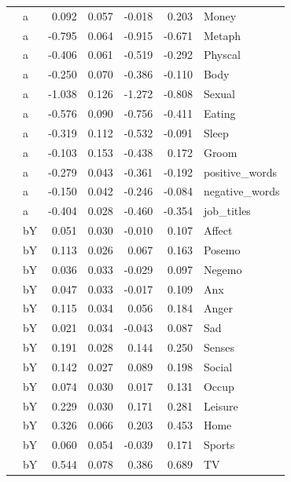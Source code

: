 \documentclass[11pt,a4paper]{article}
\begin{document}
\begin{longtable}{llrrrrl}
   & a &  0.092 &  0.057 &   -0.018 &     0.203 &           Money \\
   & a & -0.795 &  0.064 &   -0.915 &    -0.671 &          Metaph \\
   & a & -0.406 &  0.061 &   -0.519 &    -0.292 &         Physcal \\
   & a & -0.250 &  0.070 &   -0.386 &    -0.110 &            Body \\
   & a & -1.038 &  0.126 &   -1.272 &    -0.808 &          Sexual \\
   & a & -0.576 &  0.090 &   -0.756 &    -0.411 &          Eating \\
   & a & -0.319 &  0.112 &   -0.532 &    -0.091 &           Sleep \\
   & a & -0.103 &  0.153 &   -0.438 &     0.172 &           Groom \\
   & a & -0.279 &  0.043 &   -0.361 &    -0.192 &  positive\_words \\
   & a & -0.150 &  0.042 &   -0.246 &    -0.084 &  negative\_words \\
   & a & -0.404 &  0.028 &   -0.460 &    -0.354 &      job\_titles \\
   & bY &  0.051 &  0.030 &   -0.010 &     0.107 &          Affect \\
   & bY &  0.113 &  0.026 &    0.067 &     0.163 &          Posemo \\
   & bY &  0.036 &  0.033 &   -0.029 &     0.097 &          Negemo \\
   & bY &  0.047 &  0.033 &   -0.017 &     0.109 &             Anx \\
   & bY &  0.115 &  0.034 &    0.056 &     0.184 &           Anger \\
   & bY &  0.021 &  0.034 &   -0.043 &     0.087 &             Sad \\
   & bY &  0.191 &  0.028 &    0.144 &     0.250 &          Senses \\
   & bY &  0.142 &  0.027 &    0.089 &     0.198 &          Social \\
   & bY &  0.074 &  0.030 &    0.017 &     0.131 &           Occup \\
   & bY &  0.229 &  0.030 &    0.171 &     0.281 &         Leisure \\
   & bY &  0.326 &  0.066 &    0.203 &     0.453 &            Home \\
   & bY &  0.060 &  0.054 &   -0.039 &     0.171 &          Sports \\
   & bY &  0.544 &  0.078 &    0.386 &     0.689 &              TV \\

\end{longtable}
\end{document}

